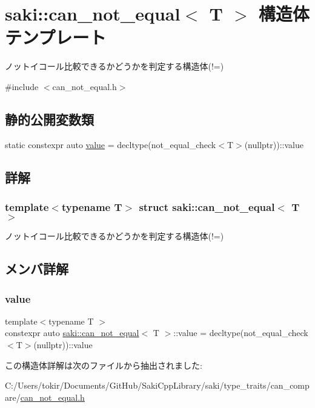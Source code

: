 \hypertarget{structsaki_1_1can__not__equal}{}\section{saki\+:\+:can\+\_\+not\+\_\+equal$<$ T $>$ 構造体テンプレート}
\label{structsaki_1_1can__not__equal}


ノットイコール比較できるかどうかを判定する構造体(!=)  




{\ttfamily \#include $<$can\+\_\+not\+\_\+equal.\+h$>$}

\subsection*{静的公開変数類}
\begin{DoxyCompactItemize}
\item 
static constexpr auto \mbox{\hyperlink{structsaki_1_1can__not__equal_a5e6df940e64a430f970175377610d460}{value}} = decltype(not\+\_\+equal\+\_\+check$<$T$>$(nullptr))\+::value
\end{DoxyCompactItemize}


\subsection{詳解}
\subsubsection*{template$<$typename T$>$\newline
struct saki\+::can\+\_\+not\+\_\+equal$<$ T $>$}

ノットイコール比較できるかどうかを判定する構造体(!=) 

\subsection{メンバ詳解}
\mbox{\label{structsaki_1_1can__not__equal_a5e6df940e64a430f970175377610d460}} 
\subsubsection{\texorpdfstring{value}{value}}
{\footnotesize\ttfamily template$<$typename T $>$ \\
constexpr auto \mbox{\hyperlink{structsaki_1_1can__not__equal}{saki\+::can\+\_\+not\+\_\+equal}}$<$ T $>$\+::value = decltype(not\+\_\+equal\+\_\+check$<$T$>$(nullptr))\+::value\hspace{0.3cm}{\ttfamily [static]}}



この構造体詳解は次のファイルから抽出されました\+:\begin{DoxyCompactItemize}
\item 
C\+:/\+Users/tokir/\+Documents/\+Git\+Hub/\+Saki\+Cpp\+Library/saki/type\+\_\+traits/can\+\_\+compare/\mbox{\hyperlink{can__not__equal_8h}{can\+\_\+not\+\_\+equal.\+h}}\end{DoxyCompactItemize}
